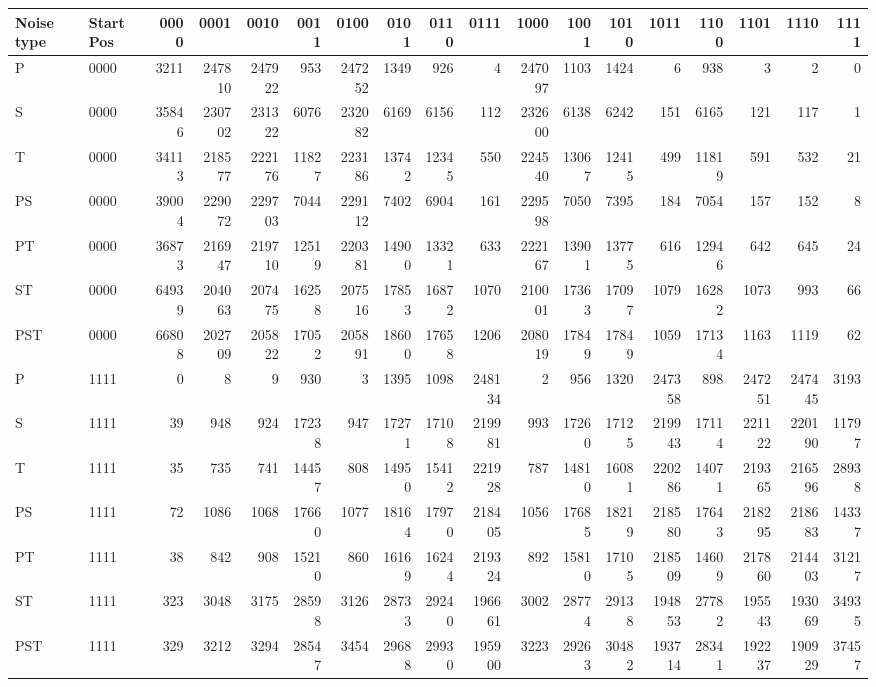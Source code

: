 \begin{tabular}{llrrrrrrrrrrrrrrrr}
\toprule
Noise type & Start Pos & 0000 & 0001 & 0010 & 0011 & 0100 & 0101 & 0110 & 0111 & 1000 & 1001 & 1010 & 1011 & 1100 & 1101 & 1110 & 1111 \\
\midrule
P & 0000 & 3211 & 247810 & 247922 & 953 & 247252 & 1349 & 926 & 4 & 247097 & 1103 & 1424 & 6 & 938 & 3 & 2 & 0 \\
S & 0000 & 35846 & 230702 & 231322 & 6076 & 232082 & 6169 & 6156 & 112 & 232600 & 6138 & 6242 & 151 & 6165 & 121 & 117 & 1 \\
T & 0000 & 34113 & 218577 & 222176 & 11827 & 223186 & 13742 & 12345 & 550 & 224540 & 13067 & 12415 & 499 & 11819 & 591 & 532 & 21 \\
PS & 0000 & 39004 & 229072 & 229703 & 7044 & 229112 & 7402 & 6904 & 161 & 229598 & 7050 & 7395 & 184 & 7054 & 157 & 152 & 8 \\
PT & 0000 & 36873 & 216947 & 219710 & 12519 & 220381 & 14900 & 13321 & 633 & 222167 & 13901 & 13775 & 616 & 12946 & 642 & 645 & 24 \\
ST & 0000 & 64939 & 204063 & 207475 & 16258 & 207516 & 17853 & 16872 & 1070 & 210001 & 17363 & 17097 & 1079 & 16282 & 1073 & 993 & 66 \\
PST & 0000 & 66808 & 202709 & 205822 & 17052 & 205891 & 18600 & 17658 & 1206 & 208019 & 17849 & 17849 & 1059 & 17134 & 1163 & 1119 & 62 \\
P & 1111 & 0 & 8 & 9 & 930 & 3 & 1395 & 1098 & 248134 & 2 & 956 & 1320 & 247358 & 898 & 247251 & 247445 & 3193 \\
S & 1111 & 39 & 948 & 924 & 17238 & 947 & 17271 & 17108 & 219981 & 993 & 17260 & 17125 & 219943 & 17114 & 221122 & 220190 & 11797 \\
T & 1111 & 35 & 735 & 741 & 14457 & 808 & 14950 & 15412 & 221928 & 787 & 14810 & 16081 & 220286 & 14071 & 219365 & 216596 & 28938 \\
PS & 1111 & 72 & 1086 & 1068 & 17660 & 1077 & 18164 & 17970 & 218405 & 1056 & 17685 & 18219 & 218580 & 17643 & 218295 & 218683 & 14337 \\
PT & 1111 & 38 & 842 & 908 & 15210 & 860 & 16169 & 16244 & 219324 & 892 & 15810 & 17105 & 218509 & 14609 & 217860 & 214403 & 31217 \\
ST & 1111 & 323 & 3048 & 3175 & 28598 & 3126 & 28733 & 29240 & 196661 & 3002 & 28774 & 29138 & 194853 & 27782 & 195543 & 193069 & 34935 \\
PST & 1111 & 329 & 3212 & 3294 & 28547 & 3454 & 29688 & 29930 & 195900 & 3223 & 29263 & 30482 & 193714 & 28341 & 192237 & 190929 & 37457 \\
\bottomrule
\end{tabular}
